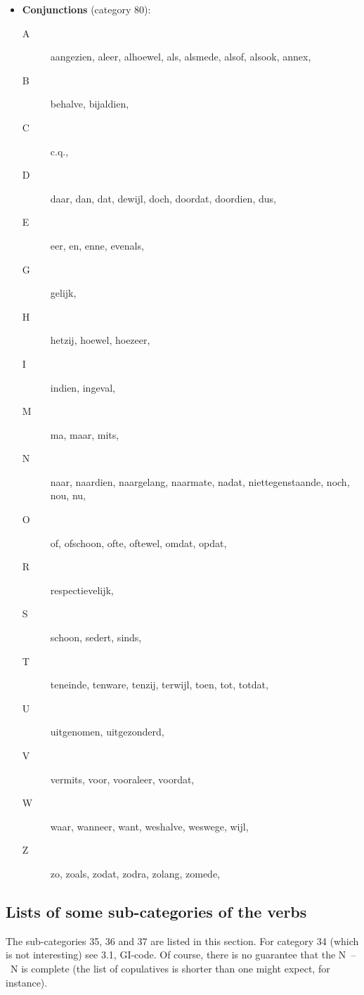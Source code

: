 \begin{itemize}
  \item {\bf Conjunctions} (category 80):
    \begin{description}
      \item [A] aangezien, aleer, alhoewel, als, alsmede, alsof, alsook, annex, 
      \item [B] behalve, bijaldien, 
      \item [C] c.q., 
      \item [D] daar, dan, dat, dewijl, doch, doordat, doordien, dus, 
      \item [E] eer, en, enne, evenals, 
      \item [G] gelijk, 
      \item [H] hetzij, hoewel, hoezeer,
      \item [I] indien, ingeval, 
      \item [M] ma, maar, mits, 
      \item [N] naar, naardien, naargelang, naarmate, nadat, niettegenstaande,
                noch, nou, nu, 
      \item [O] of, ofschoon, ofte, oftewel, omdat, opdat, 
      \item [R] respectievelijk, 
      \item [S] schoon, sedert, sinds, 
      \item [T] teneinde, tenware, tenzij, terwijl, toen, tot, totdat, 
      \item [U] uitgenomen, uitgezonderd, 
      \item [V] vermits, voor, vooraleer, voordat, 
      \item [W] waar, wanneer, want, weshalve, weswege, wijl, 
      \item [Z] zo, zoals, zodat, zodra, zolang, zomede, 
   \end{description}
\end{itemize}
\subsection{Lists of some sub-categories of the verbs}

The sub-categories 35, 36 and 37 are listed in this section. 
For category 34
(which is not interesting) see 3.1, GI-code. Of course, there is no 
guarantee that the N~--~N is complete (the list of copulatives is shorter
than one might expect, for instance).

